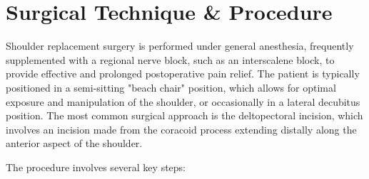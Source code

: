 \section*{Surgical Technique \& Procedure}
Shoulder replacement surgery is performed under general anesthesia, frequently supplemented with a regional nerve block, such as an interscalene block, to provide effective and prolonged postoperative pain relief. The patient is typically positioned in a semi-sitting "beach chair" position, which allows for optimal exposure and manipulation of the shoulder, or occasionally in a lateral decubitus position. The most common surgical approach is the deltopectoral incision, which involves an incision made from the coracoid process extending distally along the anterior aspect of the shoulder.

The procedure involves several key steps:
